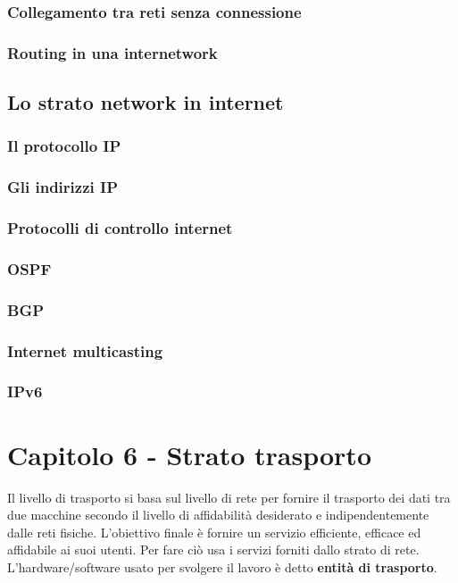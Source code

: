 \subsubsection{Collegamento tra reti senza connessione}

\subsubsection{Routing in una internetwork}

\subsection{Lo strato network in internet}

\subsubsection{Il protocollo IP}

\subsubsection{Gli indirizzi IP}

\subsubsection{Protocolli di controllo internet}


\subsubsection{OSPF}

\subsubsection{BGP}

\subsubsection{Internet multicasting}

\subsubsection{IPv6}

\newpage
\section{Capitolo 6 - Strato trasporto}
Il livello di trasporto si basa sul livello di rete per fornire il trasporto dei dati tra due macchine secondo il livello di affidabilità desiderato e indipendentemente dalle reti fisiche. 
L'obiettivo finale è fornire un servizio efficiente, efficace ed affidabile ai suoi utenti.
Per fare ciò usa i servizi forniti dallo strato di rete. L'hardware/software usato per svolgere il lavoro è detto \textbf{entità di trasporto}.

